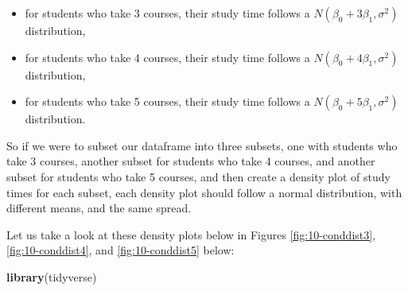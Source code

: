 \documentclass[
]{book}
\newenvironment{Shaded}{\begin{snugshade}}{\end{snugshade}}
\newcommand{\AttributeTok}[1]{\textcolor[rgb]{0.13,0.29,0.53}{#1}}
\newcommand{\DecValTok}[1]{\textcolor[rgb]{0.00,0.00,0.81}{#1}}
\newcommand{\DocumentationTok}[1]{\textcolor[rgb]{0.56,0.35,0.01}{\textbf{\textit{#1}}}}
\newcommand{\FloatTok}[1]{\textcolor[rgb]{0.00,0.00,0.81}{#1}}
\newcommand{\FunctionTok}[1]{\textcolor[rgb]{0.13,0.29,0.53}{\textbf{#1}}}
\newcommand{\NormalTok}[1]{#1}
\newcommand{\OtherTok}[1]{\textcolor[rgb]{0.56,0.35,0.01}{#1}}
\newcommand{\SpecialCharTok}[1]{\textcolor[rgb]{0.81,0.36,0.00}{\textbf{#1}}}
\newcommand{\StringTok}[1]{\textcolor[rgb]{0.31,0.60,0.02}{#1}}
\providecommand{\tightlist}{%
  \setlength{\itemsep}{0pt}\setlength{\parskip}{0pt}}
\begin{document}
\begin{itemize}
\tightlist
\item
  for students who take 3 courses, their study time follows a \(N(\beta_0 + 3\beta_1, \sigma^2)\) distribution,
\item
  for students who take 4 courses, their study time follows a \(N(\beta_0 + 4\beta_1, \sigma^2)\) distribution,
\item
  for students who take 5 courses, their study time follows a \(N(\beta_0 + 5\beta_1, \sigma^2)\) distribution.
\end{itemize}

So if we were to subset our dataframe into three subsets, one with students who take 3 courses, another subset for students who take 4 courses, and another subset for students who take 5 courses, and then create a density plot of study times for each subset, each density plot should follow a normal distribution, with different means, and the same spread.

Let us take a look at these density plots below in Figures \ref{fig:10-conddist3}, \ref{fig:10-conddist4}, and \ref{fig:10-conddist5} below:

\begin{Shaded}
\begin{Highlighting}[]
\FunctionTok{library}\NormalTok{(tidyverse)}
\end{Highlighting}
\end{Shaded}

\begin{Shaded}
\end{Shaded}
\end{document}
